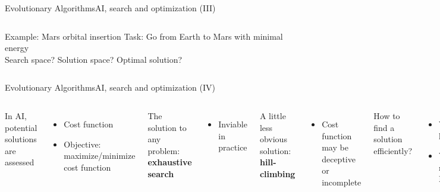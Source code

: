 \documentclass[10pt,compress]{beamer} %
\begin{document}
\begin{frame}{Evolutionary Algorithms}{AI, search and optimization (III)}
    \begin{columns}
	\begin{exampleblock}{Example: Mars orbital insertion}
		Task: Go from Earth to Mars with minimal energy\\
		Search space? Solution space? Optimal solution?
        \end{exampleblock}

	   \begin{center}
 	   \setlength{\fboxrule}{0pt}
	   \end{center}
	\end{columns}
\end{frame}

\begin{frame}{Evolutionary Algorithms}{AI, search and optimization (IV)}
    \begin{columns}
	In AI, potential solutions are assessed
	\begin{itemize}
		\item Cost function
		\item Objective: maximize/minimize cost function
	\end{itemize}
	The solution to any problem: \textbf{exhaustive search}
	\begin{itemize}
	\item Inviable in practice
	\end{itemize}
    A little less obvious solution: \textbf{hill-climbing}
    \begin{itemize}
    \item Cost function may be deceptive or incomplete
    \end{itemize}
	How to find a solution efficiently?
	\begin{itemize}
		\item With domain knowledge
		\item With randomness: \alert{Metaheuristics}
	\end{itemize}

	\begin{center}
		\texttt{[image: figs/landscape.png]}\\
		\tiny{\href{http://www.handmade-insights.com/blog/2013/genetic-algorithmslandscape}{(Source)}}\\
	\end{center}
	\end{columns}
\end{frame}
\end{document}
